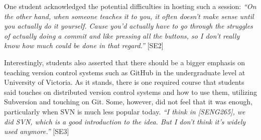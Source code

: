 


One student acknowledged the potential difficulties in hosting such a session: \textit{``On the other hand, when someone teaches it to you, it often doesn't make sense until you actually do it yourself. Cause you'd actually have to go through the struggles of actually doing a commit and like pressing all the buttons, so I don't really know how much could be done in that regard.''} [SE2]

Interestingly, students also asserted that there should be a bigger emphasis on teaching version control systems such as GitHub in the undergraduate level at University of Victoria. As it stands, there is one required course that students said touches on distributed version control systems and how to use them, utilizing Subversion and touching on Git. Some, however, did not feel that it was enough, particularly when SVN is much less popular today. \textit{``I think in [SENG265], we did SVN, which is a good introduction to the idea. But I don't think it's widely used anymore.''} [SE3]




